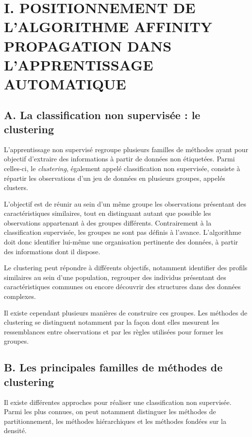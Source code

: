 \documentclass[
  letterpaper,
  DIV=11,
  numbers=noendperiod]{scrartcl}
\begin{document}
\newpage

\section{I. POSITIONNEMENT DE L'ALGORITHME AFFINITY PROPAGATION DANS
L'APPRENTISSAGE
AUTOMATIQUE}\label{i.-positionnement-de-lalgorithme-affinity-propagation-dans-lapprentissage-automatique}

\subsection{A. La classification non supervisée : le
clustering}\label{a.-la-classification-non-supervisuxe9e-le-clustering}

L'apprentissage non supervisé regroupe plusieurs familles de méthodes
ayant pour objectif d'extraire des informations à partir de données non
étiquetées. Parmi celles-ci, le \emph{clustering}, également appelé
classification non supervisée, consiste à répartir les observations d'un
jeu de données en plusieurs groupes, appelés clusters.

L'objectif est de réunir au sein d'un même groupe les observations
présentant des caractéristiques similaires, tout en distinguant autant
que possible les observations appartenant à des groupes différents.
Contrairement à la classification supervisée, les groupes ne sont pas
définis à l'avance. L'algorithme doit donc identifier lui-même une
organisation pertinente des données, à partir des informations dont il
dispose.

Le clustering peut répondre à différents objectifs, notamment identifier
des profils similaires au sein d'une population, regrouper des individus
présentant des caractéristiques communes ou encore découvrir des
structures dans des données complexes.

Il existe cependant plusieurs manières de construire ces groupes. Les
méthodes de clustering se distinguent notamment par la façon dont elles
mesurent les ressemblances entre observations et par les règles
utilisées pour former les groupes.

\subsection{B. Les principales familles de méthodes de
clustering}\label{b.-les-principales-familles-de-muxe9thodes-de-clustering}

Il existe différentes approches pour réaliser une classification non
supervisée. Parmi les plus connues, on peut notamment distinguer les
méthodes de partitionnement, les méthodes hiérarchiques et les méthodes
fondées sur la densité.
\end{document}
